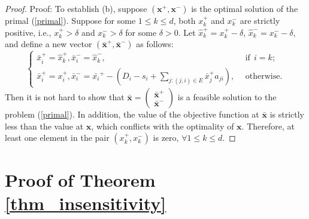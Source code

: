 \documentclass[final,11pt,3p]{article}\usepackage{setspace}
\begin{document}
\begin{proof}{Proof:}
To establish (b), suppose $(\boldsymbol{x}^+, \boldsymbol{x}^-)$ is the optimal solution of the primal (\ref{primal}). Suppose for some $1 \le k \le d$, both $x_k^+$ and $x_k^-$ are strictly positive, i.e., $x_k^+ > \delta$ and $x_k^- > \delta $ for some $\delta >0$. Let $\hat{x}_k^+=x_k^+ - \delta$, $\hat{x}_k^-=x_k^- - \delta$, and define a new vector $(\bar{\boldsymbol{x}}^+,\bar{\boldsymbol{x}}^-)$ as follows:
\begin{equation*}
\begin{cases}
\bar{x}_i^+ = \hat{x}_k^+, \bar{x}_i^- = \hat{x}_k^-, &~~\text{if} ~~ i=k; \\
\bar{x}_i^+ = x_i^+, \bar{x}_i^- = \bar{x_i}^+ - (D_i - s_i + \sum_{j:(j,i)\in E}\bar{x}_j^+ a_{ji}) , &~~\text{otherwise}.
\end{cases}
\end{equation*}
Then it is not hard to show that $\bar{\boldsymbol{x}} = \begin{pmatrix}\bar{\boldsymbol{x}}^+ \\ \bar{\boldsymbol{x}}^- \end{pmatrix}$ is a feasible solution to the problem (\ref{primal}). In addition, the value of the objective function at $\bar{\boldsymbol{x}}$ is strictly less than the value at $\boldsymbol{x}$, which conflicts with the optimality of $\boldsymbol{x}$. Therefore, at least one element in the pair $(x_k^+, x_k^-)$ is zero, $\forall 1 \le k \le d$. {}
\end{proof}

\section{Proof of Theorem \ref{thm_insensitivity} } \label{appendix: thm_insensitivity}
\end{document}
